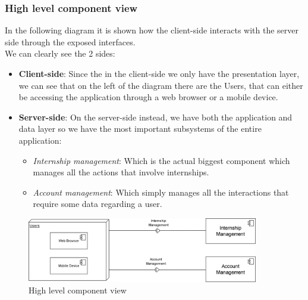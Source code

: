 \documentclass[11pt,twoside]{article}
\begin{document}
		\subsubsection{High level component view}
In the following diagram it is shown how the client-side interacts with the server side through the exposed interfaces.\\
We can clearly see the 2 sides:
\begin{itemize}
\item \textbf{Client-side}: Since the in the client-side we only have the presentation layer, we can see that on the left of the diagram there are the Users, that can either be accessing the application through a web browser or a mobile device.
\item \textbf{Server-side}: On the server-side instead, we have both the application and data layer so we have the most important subsystems of the entire application:
	\begin{itemize}
	\item \textit{Internship management}: Which is the actual biggest component which manages all the actions that involve internships.
	\item \textit{Account management}: Which simply manages all the interactions that require some data regarding a user.
	\end{itemize}
\end{itemize}

\begin{figure}[H]
\centering
\includegraphics[width=0.9\textwidth]{Images/Component}
\caption{High level component view}\label{Component}
\end{figure}
\vspace{\baselineskip}
\end{document}
